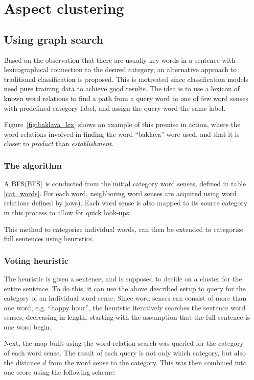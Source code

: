 \documentclass[a4paper,11pt]{kth-mag}
\begin{document}
\newpage

\section{Aspect clustering}
\subsection{Using graph search}
Based on the observation that there are usually key words in a sentence with lexicographical connection to the desired category, an alternative approach to traditional classification is proposed. This is motivated since classification models need pure training data to achieve good results. The idea is to use a lexicon of known word relations to find a path from a query word to one of few word senses with predefined category label, and assign the query word the same label.

Figure~\ref{fig:baklava_lex} shows an example of this premise in action, where the word relations involved in finding the word ``baklava'' were used, and that it is closer to \emph{product} than \emph{establishment}.

\subsubsection{The algorithm}
A \gls{BFS}(BFS) is conducted from the initial category word senses, defined in table \ref{cat_words}. For each word, neighboring word senses are acquired using word relations defined by \gls{jaws}). Each word sense is also mapped to its source category in this process to allow for quick look-ups.

This method to categorize individual words, can then be extended to categorize full sentences using heuristics.

\subsubsection{Voting heuristic}
The heuristic is given a sentence, and is supposed to decide on a cluster for the entire sentence. To do this, it can use the above described setup to query for the category of an individual word sense. Since word senses can consist of more than one word, e.g. ``happy hour'', the heuristic iteratively searches the sentence word senses, decreasing in length, starting with the assumption that the full sentence is one word begin.

Next, the map built using the word relation search was queried for the category of each word sense. The result of each query is not only which category, but also the distance $d$ from the word sense to the category. This was then combined into one score using the following scheme:
\end{document}
